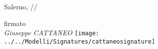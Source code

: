 \documentclass[italian,a4paper]{europasscv}
\newcommand{\currentDate}{\svnfileday/\svnfilemonth/\svnfileyear}
\begin{document}
\begin{europasscv}
  
  
%  
%  
%  
%  
%  
%
%  
%  
%
%
%
%  


\bigskip

Salerno, \currentDate

\hfill\parbox[t]{8cm}{
  \begin{center}
    firmato\\
    \textit{Giuseppe CATTANEO}
	 \texttt{[image: ../../Modelli/Signatures/cattaneosignature]}
  \end{center}
}
	

  \clearpage
  
  \end{europasscv}
\end{document}
